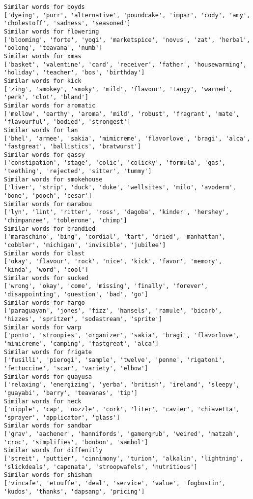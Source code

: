 \documentclass[11pt]{article}
\begin{document}
\begin{Verbatim}[commandchars=\\\{\}]
Similar words for boyds
['dyeing', 'purr', 'alternative', 'poundcake', 'impar', 'cody', 'amy', 'cholestoff', 'sadness', 'seasoned']
Similar words for flowering
['blooming', 'forte', 'yogi', 'marketspice', 'novus', 'zat', 'herbal', 'oolong', 'teavana', 'numb']
Similar words for xmas
['basket', 'valentine', 'card', 'receiver', 'father', 'housewarming', 'holiday', 'teacher', 'bos', 'birthday']
Similar words for kick
['zing', 'smokey', 'smoky', 'mild', 'flavour', 'tangy', 'warned', 'perk', 'clot', 'bland']
Similar words for aromatic
['mellow', 'earthy', 'aroma', 'mild', 'robust', 'fragrant', 'mate', 'flavourful', 'bodied', 'strongest']
Similar words for lan
['bhel', 'armee', 'sakia', 'mimicreme', 'flavorlove', 'bragi', 'alca', 'fastgreat', 'ballistics', 'bratwurst']
Similar words for gassy
['constipation', 'stage', 'colic', 'colicky', 'formula', 'gas', 'teething', 'rejected', 'sitter', 'tummy']
Similar words for smokehouse
['liver', 'strip', 'duck', 'duke', 'wellsites', 'milo', 'avoderm', 'bone', 'pooch', 'cesar']
Similar words for marabou
['lyn', 'lint', 'ritter', 'ross', 'dagoba', 'kinder', 'hershey', 'chimpanzee', 'toblerone', 'chimp']
Similar words for brandied
['maraschino', 'bing', 'cordial', 'tart', 'dried', 'manhattan', 'cobbler', 'michigan', 'invisible', 'jubilee']
Similar words for blast
['okay', 'flavour', 'rock', 'nice', 'kick', 'favor', 'memory', 'kinda', 'word', 'cool']
Similar words for sucked
['wrong', 'okay', 'come', 'missing', 'finally', 'forever', 'disappointing', 'question', 'bad', 'go']
Similar words for fargo
['paraguayan', 'jones', 'fizz', 'hansels', 'ramule', 'bicarb', 'hizzes', 'spritzer', 'sodastream', 'sprite']
Similar words for warp
['ponto', 'stroopies', 'organizer', 'sakia', 'bragi', 'flavorlove', 'mimicreme', 'camping', 'fastgreat', 'alca']
Similar words for frigate
['fusilli', 'pierogi', 'sample', 'twelve', 'penne', 'rigatoni', 'fettuccine', 'scar', 'variety', 'elbow']
Similar words for guayusa
['relaxing', 'energizing', 'yerba', 'british', 'ireland', 'sleepy', 'guayabi', 'barry', 'teavanas', 'tip']
Similar words for neck
['nipple', 'cap', 'nozzle', 'cork', 'liter', 'cavier', 'chiavetta', 'sprayer', 'applicator', 'glass']
Similar words for sandbar
['grav', 'aachener', 'hannifords', 'gamergrub', 'weired', 'matzah', 'croc', 'simplifies', 'bonbon', 'sambol']
Similar words for diffenitly
['streit', 'puttier', 'cinnimony', 'turion', 'alkalin', 'lightning', 'slickdeals', 'caponata', 'stroopwafels', 'nutritious']
Similar words for shisham
['vincafe', 'etouffe', 'deal', 'service', 'value', 'fogbustin', 'kudos', 'thanks', 'dapsang', 'pricing']

\end{Verbatim}
\end{document}
